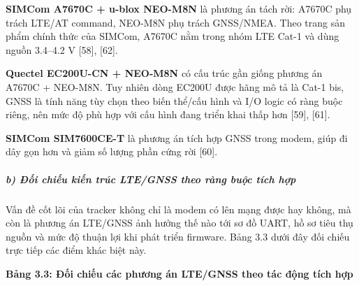 \documentclass[13pt,a4paper]{extarticle}
\renewcommand{\\}{\thesislongtableorignewline\hline}%
\newcommand{\thesistabletitle}[1]{%
  \begin{center}\textbf{#1}\end{center}%
}
\begin{document}
\textbf{SIMCom A7670C + u-blox NEO-M8N} là phương án tách rời: A7670C
phụ trách LTE/AT command, NEO-M8N phụ trách GNSS/NMEA. Theo trang sản
phẩm chính thức của SIMCom, A7670C nằm trong nhóm LTE Cat-1 và dùng
nguồn 3.4--4.2 V {[}58{]}, {[}62{]}.

\textbf{Quectel EC200U-CN + NEO-M8N} có cấu trúc gần giống phương án
A7670C + NEO-M8N. Tuy nhiên dòng EC200U được hãng mô tả là Cat-1 bis,
GNSS là tính năng tùy chọn theo biến thể/cấu hình và I/O logic có ràng
buộc riêng, nên mức độ phù hợp với cấu hình đang triển khai thấp hơn
{[}59{]}, {[}61{]}.

\textbf{SIMCom SIM7600CE-T} là phương án tích hợp GNSS trong modem, giúp
đi dây gọn hơn và giảm số lượng phần cứng rời {[}60{]}.

\subparagraph{b) Đối chiếu kiến trúc LTE/GNSS theo ràng buộc tích
hợp}\label{b-ux111ux1ed1i-chiux1ebfu-kiux1ebfn-truxfac-ltegnss-theo-ruxe0ng-buux1ed9c-tuxedch-hux1ee3p}

Vấn đề cốt lõi của tracker không chỉ là modem có lên mạng được hay
không, mà còn là phương án LTE/GNSS ảnh hưởng thế nào tới sơ đồ UART, hồ
sơ tiêu thụ nguồn và mức độ thuận lợi khi phát triển firmware. Bảng 3.3
dưới đây đối chiếu trực tiếp các điểm khác biệt này.

\thesistabletitle{Bảng 3.3: Đối chiếu các phương án LTE/GNSS theo tác động tích hợp}
\end{document}
